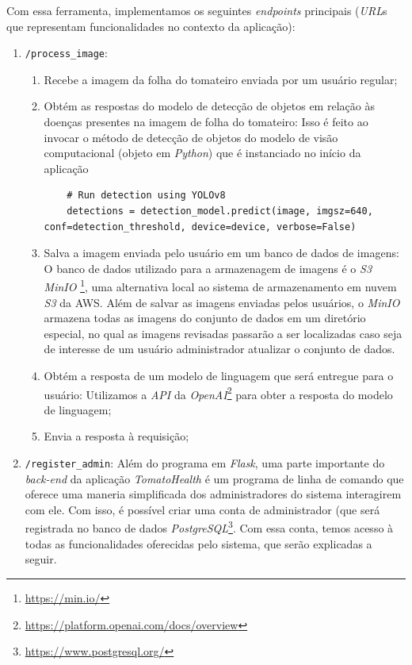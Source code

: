 Com essa ferramenta, implementamos os seguintes \emph{endpoints} principais (\emph{URL}s que representam funcionalidades no contexto da aplicação):
\begin{enumerate}
    \item \texttt{/process\_image}:
    \begin{enumerate}
        \item Recebe a imagem da folha do tomateiro enviada por um usuário regular;
        \item Obtém as respostas do modelo de detecção de objetos em relação às doenças presentes na imagem de folha do tomateiro:
        Isso é feito ao invocar o método de detecção de objetos do modelo de visão computacional (objeto em \emph{Python}) que é instanciado no início da aplicação
        \begin{lstlisting}
    # Run detection using YOLOv8
    detections = detection_model.predict(image, imgsz=640, conf=detection_threshold, device=device, verbose=False)
        \end{lstlisting}
        \item Salva a imagem enviada pelo usuário em um banco de dados de imagens:
        O banco de dados utilizado para a armazenagem de imagens é o \emph{S3 MinIO} \footnote{\url{https://min.io/}}, uma alternativa local ao sistema de armazenamento em nuvem \emph{S3} da AWS. Além de salvar as imagens enviadas pelos usuários, o \emph{MinIO} armazena todas as imagens do conjunto de dados em um diretório especial, no qual as imagens revisadas passarão a ser localizadas caso seja de interesse de um usuário administrador atualizar o conjunto de dados.
        \item Obtém a resposta de um modelo de linguagem que será entregue para o usuário:
        Utilizamos a \emph{API} da \emph{OpenAI}\footnote{\url{https://platform.openai.com/docs/overview}} para obter a resposta do modelo de linguagem;
        \item Envia a resposta à requisição;
    \end{enumerate}
    \item \texttt{/register\_admin}:
    Além do programa em \emph{Flask}, uma parte importante do \emph{back-end} da aplicação \emph{TomatoHealth} é um programa de linha de comando que oferece uma maneria simplificada dos administradores do sistema interagirem com ele. Com isso, é possível criar uma conta de administrador (que será registrada no banco de dados \emph{PostgreSQL}\footnote{\url{https://www.postgresql.org/}}. Com essa conta, temos acesso à todas as funcionalidades oferecidas pelo sistema, que serão explicadas a seguir.

\end{enumerate}
